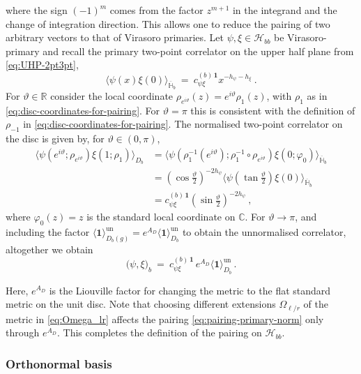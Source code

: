 \documentclass[11pt,a4paper]{article}
\numberwithin{equation}{section}
\newcommand{\one}{\mathbf{1}} %
\begin{document}
where the sign $(-1)^m$ comes from the factor $z^{m+1}$ in the integrand and the change of integration direction. 
This allows one to reduce the pairing of two arbitrary vectors to that of Virasoro primaries. Let $\psi,\xi \in \mathcal{H}_{bb}$ be Virasoro-primary and recall the primary two-point correlator on the upper half plane from \eqref{eq:UHP-2pt3pt},
\begin{equation}
    \big\langle \psi(x) \xi(0) \big\rangle_{\overline{\mathbb{H}}_b} ~=~ c^{(b) \, \one}_{\psi\xi} x^{-h_\psi-h_\xi}  ~.
\end{equation}
For $\vartheta \in \mathbb{R}$ consider the local coordinate $\rho_{e^{i\vartheta}}(z) = e^{i \vartheta} \rho_1(z)$, with $\rho_1$ as in \eqref{eq:disc-coordinates-for-pairing}. For $\vartheta = \pi$ this is consistent with the definition of $\rho_{-1}$ in \eqref{eq:disc-coordinates-for-pairing}.
The normalised two-point correlator on the disc is given by, for $\vartheta \in (0,\pi)$,
\begin{align}
	\big\langle \psi(e^{i\vartheta};\rho_{e^{i\vartheta}}) \xi(1;\rho_1) \big\rangle_{D_b}
	&=
	\big\langle \psi(\rho_1^{-1}(e^{i\vartheta});\rho_1^{-1} \circ \rho_{e^{i\vartheta}}) \xi(0;\varphi_0) \big\rangle_{\overline{\mathbb{H}}_b}
	\nonumber\\
	&= (\cos\tfrac\vartheta2)^{-2 h_\psi}
	\big\langle \psi(\tan\tfrac\vartheta2)  
	\xi(0) \big\rangle_{\overline{\mathbb{H}}_b}
	\nonumber\\
	&= c^{(b) \, \one}_{\psi\xi} (\sin\tfrac\vartheta2)^{-2 h_\psi} ~,
\end{align}
where $\varphi_0(z)=z$ is the standard local coordinate on $\mathbb{C}$. For $\vartheta \to \pi$, and including the factor $\langle \one \rangle^\mathrm{un}_{D_b(g)}=e^{A_D}\langle \one \rangle^\mathrm{un}_{D_b}$
to obtain the unnormalised correlator, altogether we obtain
\begin{equation}
	\big( \psi , \xi \big)_b ~=~ c^{(b) \, \one}_{\psi\xi} 
	\,
	e^{A_D}\langle \one \rangle^\mathrm{un}_{D_b} \,.
	\label{eq:pairing-primary-norm}
\end{equation}

\noindent
Here, $e^{A_D}$ is the Liouville factor for changing the metric to the flat standard metric on the unit disc. 
Note that choosing different extensions $\Omega_{\ell/r}$ of the metric in \eqref{eq:Omega_lr} affects the pairing \eqref{eq:pairing-primary-norm} only through $e^{A_D}$. 
This completes the definition of the pairing on $\mathcal{H}_{bb}$.

\subsubsection*{Orthonormal basis}
\end{document}
